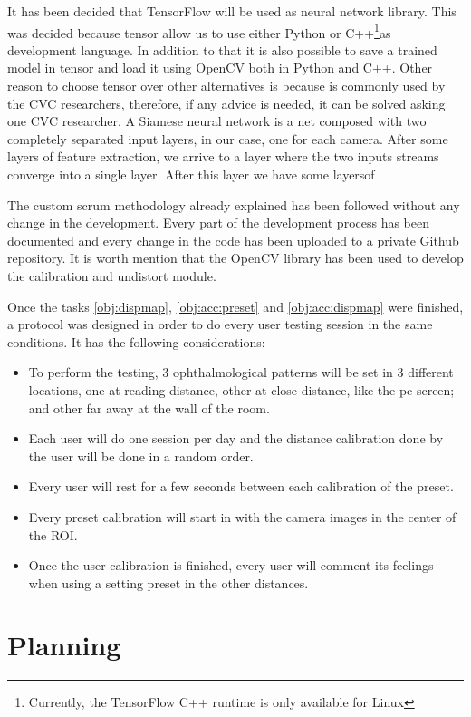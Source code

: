 \documentclass[10pt,a4paper,twocolumn,twoside]{article}
\begin{document}
	It has been decided that TensorFlow \cite{web:tensor} will be used as neural network library. This was decided because tensor allow us to use either Python or C++\footnote{Currently, the TensorFlow C++ runtime is only available for Linux}as development language. In addition to that it is also possible to save a trained model in tensor and load it using OpenCV both in Python and C++. Other reason to choose tensor over other alternatives is because is commonly used by the CVC researchers, therefore, if any advice is needed, it can be solved asking one CVC researcher.
	A Siamese neural network is a net composed with two completely separated input layers, in our case, one for each camera. After some layers of feature extraction, we arrive to a layer where the two inputs streams converge into a single layer. After this layer we have some layersof  
	
	The custom scrum methodology already explained has been followed without any change in the development. Every part of the development process has been documented and every change in the code has been uploaded to a private Github repository. It is worth mention that the OpenCV \cite{web:opencv} library has been used to develop the calibration and undistort module. 
	
	Once the tasks \ref{obj:dispmap}, \ref{obj:acc:preset} and \ref{obj:acc:dispmap} were finished, a protocol was designed in order to do every user testing session in the same conditions. It has the following considerations: 

	\begin{itemize}
		\item To perform the testing, 3 ophthalmological patterns will be set in 3 different locations, one at reading distance, other at close distance, like the pc screen; and other far away at the wall of the room. 
		\item  Each user will do one session per day and the distance calibration done by the user will be done in a random order. 
		\item  Every user will rest for a few seconds between each calibration of the preset.  
		\item  Every preset calibration will start in with the camera images in the center of the ROI. 
		\item  Once the user calibration is finished, every user will comment its feelings when using a setting preset in the other distances. 
	\end{itemize}
	
	
	\section{Planning}
	\label{sec:planning}
	
\end{document}
